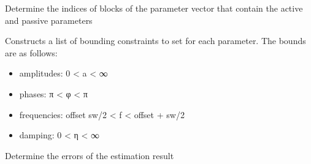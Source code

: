 \documentclass[letterpaper,10pt,english]{sphinxmanual}
\begin{document}
\begin{fulllineitems}
\begin{fulllineitems}
\end{fulllineitems}


\begin{fulllineitems}
\label{\detokenize{references/nlp/nlp:nmrespy.nlp.nlp.NonlinearProgramming._get_active_passive_indices}}
\sphinxAtStartPar
Determine the indices of blocks of the parameter vector that
contain the active and passive parameters

\end{fulllineitems}


\begin{fulllineitems}
\label{\detokenize{references/nlp/nlp:nmrespy.nlp.nlp.NonlinearProgramming._get_bounds}}
\sphinxAtStartPar
Constructs a list of bounding constraints to set for each
parameter. The bounds are as follows:
\begin{itemize}
\item {} 
\sphinxAtStartPar
amplitudes: 0 < a < ∞

\item {} 
\sphinxAtStartPar
phases: \sphinxhyphen{}π < φ < π

\item {} 
\sphinxAtStartPar
frequencies: offset \sphinxhyphen{} sw/2 < f < offset + sw/2

\item {} 
\sphinxAtStartPar
damping: 0 < η < ∞

\end{itemize}

\end{fulllineitems}


\begin{fulllineitems}
\label{\detokenize{references/nlp/nlp:nmrespy.nlp.nlp.NonlinearProgramming._get_errors}}
\sphinxAtStartPar
Determine the errors of the estimation result


\end{fulllineitems}
\end{fulllineitems}
\end{document}
